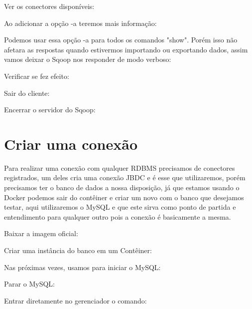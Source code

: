 \documentclass[a4paper,11pt]{article}
\begin{document}
Ver os conectores disponíveis: \\

Ao adicionar a opção -a teremos mais informação: \\

Podemos usar essa opção -a para todos os comandos "show". Porém isso não afetara as respostas quando estivermos importando ou exportando dados, assim vamos deixar o Sqoop nos responder de modo verboso: \\

Verificar se fez efeito: \\

Sair do cliente: \\

Encerrar o servidor do Sqoop: \\

\section{Criar uma conexão}
Para realizar uma conexão com qualquer RDBMS precisamos de conectores registrados, um deles cria uma conexão JBDC e é esse que utilizaremos, porém precisamos ter o banco de dados a nossa disposição, já que estamos usando o Docker podemos sair do contêiner e criar um novo com o banco que desejamos testar, aqui utilizaremos o MySQL e que este sirva como ponto de partida e entendimento para qualquer outro pois a conexão é basicamente a mesma.

Baixar a imagem oficial: \\

Criar uma instância do banco em um Contêiner: \\

Nas próximas vezes, usamos para iniciar o MySQL: \\

Parar o MySQL: \\

Entrar diretamente no gerenciador o comando: \\
\end{document}
